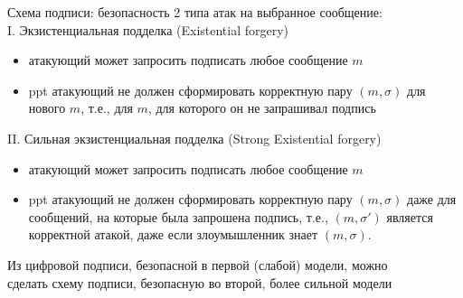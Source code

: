 \documentclass[usenames,dvipsnames,8pt,aspectratio=169]{beamer}
\begin{document}
\begin{frame}{Схема подписи: безопасность}
	\Large
	2 типа атак {\color{Orange} на выбранное сообщение}: \\[10pt]
	{\color{Orange}I. Экзистенциальная подделка (Existential forgery)} \\
	\large 
		\begin{itemize}
			\item атакующий может запросить подписать любое сообщение $m$
			\item ppt атакующий не должен сформировать корректную пару $(m, \sigma)$ для нового $m$, т.е.,  для $m$, для которого он не запрашивал подпись
		\end{itemize}
	\Large 
	\pause
	{\color{Orange}II. Сильная экзистенциальная подделка (Strong Existential forgery)} \\
	\large 
	\begin{itemize}
		\item атакующий может запросить подписать любое сообщение $m$
		\item  ppt атакующий не должен сформировать корректную пару $(m, \sigma)$  {\color{Orange}  даже для сообщений, на которые была запрошена подпись}, т.е., $(m, \sigma')$ является \\ корректной атакой, даже если злоумышленник знает $(m, \sigma)$.
	\end{itemize}

\vspace{10pt}

Из цифровой подписи, безопасной в первой (слабой) модели, можно \\ сделать схему подписи, безопасную во второй, более сильной модели
\end{frame}
\end{document}
